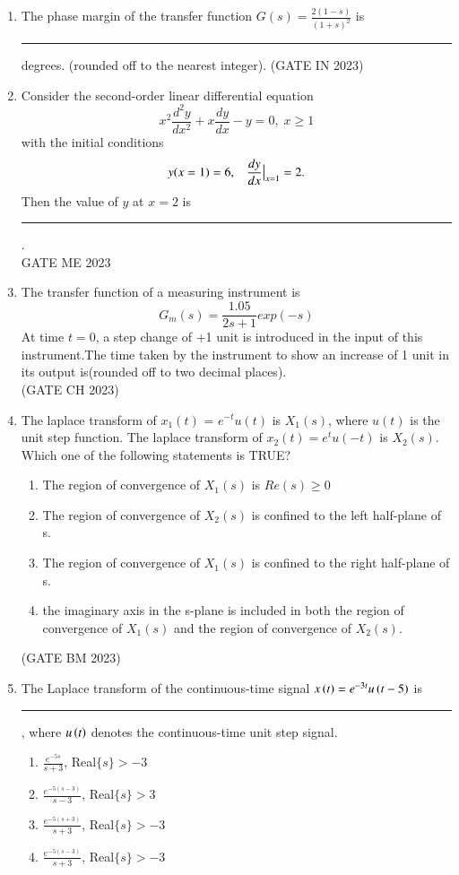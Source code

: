 \begin{enumerate}[label=\thechapter.\arabic*,ref=\thechapter.\theenumi]
\item The phase margin of the transfer function $G(s) = \frac{2(1-s)}{(1+s)^2}$ is \rule{1cm}{0.15mm} degrees. (rounded off to the nearest integer). \hfill (GATE IN 2023)\\
\solution
\newpage
\item Consider the second-order linear differential equation
\[x^2\frac{d^2y}{dx^2}+x\frac{dy}{dx}-y=0, \; x\geq 1\]
with the initial conditions \[y(x=1)=6,\; \;\; \frac{dy}{dx}\big{|}_{x=1}=2.\]
Then the value of $y$ at $x=2$ is \rule{2cm}{0.1mm}.\\{\hfill{GATE ME 2023}}\\
\solution
\newpage
\item The transfer function of a measuring instrument is \\
$$G_m(s) = \frac{1.05}{2s+1}exp(-s)$$
At time $t = 0$, a step change of +1 unit is introduced in the input of this instrument.The time taken by the instrument to show an increase of 1 unit in its output is(rounded off to two decimal places).\\ \hfill (GATE CH 2023)
\solution
\item
The laplace transform of $x_1(t)$ = $e^{-t}u(t)$ is $X_1(s)$, where $u(t)$ is the unit step function. The laplace transform of $x_2(t) = e^tu(-t)$ is $X_2(s)$. Which one of the following statements is TRUE?
\begin{enumerate}
    \item The region of convergence of $X_1(s)$ is $Re(s) \geq 0$
    \item The region of convergence of $X_2(s)$ is confined to the left half-plane of s.
    \item The region of convergence of $X_1(s)$ is confined to the right half-plane of s.
    \item the imaginary axis in the s-plane is included in both the region of convergence of $X_1(s)$ and the region of convergence of $X_2(s)$.
\end{enumerate} \hfill(GATE BM 2023)\\
\solution
\newpage

\newpage
\item The Laplace transform of the continuous-time signal $x\left(t\right) = e^{-3t}u\left(t - 5\right)$ is 
\rule{1cm}{0.15mm}, where $u\left(t\right)$ denotes the continuous-time unit step signal.

\begin{enumerate}[label = \Alph*)]
    \item $\frac{e^{-5s}}{s + 3}$, Real$\{s\} > -3$\\
    \item $\frac{e^{-5(s - 3)}}{s - 3}$, Real$\{s\} > 3$\\
    \item $\frac{e^{-5(s + 3)}}{s + 3}$, Real$\{s\} > -3$\\
    \item $\frac{e^{-5(s - 3)}}{s + 3}$, Real$\{s\} > -3$\\
\end{enumerate}
\solution

\end{enumerate}
